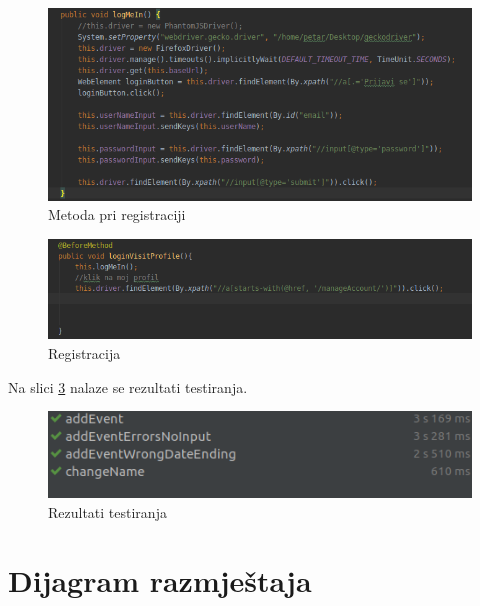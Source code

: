 \begin{figure}[H]
	\includegraphics[scale=0.4]{slike/LogMeIn.PNG}
	\centering
	\caption{Metoda pri registraciji}
	\label{fig:logmein}
\end{figure}

\begin{figure}[H]
	\includegraphics[scale=0.4]{slike/loginVisitProfile.PNG}
	\centering
	\caption{Registracija}
	\label{fig:loginvisitprofile}
\end{figure}

\normalfont\noindent Na slici \ref{fig:results} nalaze se rezultati testiranja.

\begin{figure}[H]
	\includegraphics[scale=0.4]{slike/results.PNG}
	\centering
	\caption{Rezultati testiranja}
	\label{fig:results}
\end{figure}
\eject 


\section{Dijagram razmještaja}


